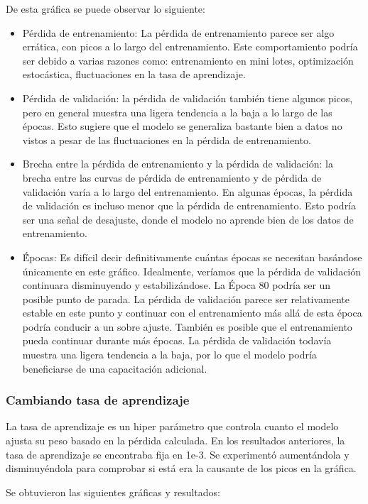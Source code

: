 \documentclass{article}
\begin{document}
De esta gráfica se puede observar lo siguiente:
\begin{itemize}
    \item Pérdida de entrenamiento: La pérdida de entrenamiento parece ser algo errática, con picos a lo largo del entrenamiento. Este comportamiento podría ser debido a varias razones como: entrenamiento en mini lotes, optimización estocástica, fluctuaciones en la tasa de aprendizaje.
    \item Pérdida de validación: la pérdida de validación también tiene algunos picos, pero en general muestra una ligera tendencia a la baja a lo largo de las épocas. Esto sugiere que el modelo se generaliza bastante bien a datos no vistos a pesar de las fluctuaciones en la pérdida de entrenamiento.
    \item Brecha entre la pérdida de entrenamiento y la pérdida de validación: la brecha entre las curvas de pérdida de entrenamiento y de pérdida de validación varía a lo largo del entrenamiento. En algunas épocas, la pérdida de validación es incluso menor que la pérdida de entrenamiento. Esto podría ser una señal de desajuste, donde el modelo no aprende bien de los datos de entrenamiento.
    \item \'Épocas: Es difícil decir definitivamente cuántas épocas se necesitan basándose únicamente en este gráfico. Idealmente, veríamos que la pérdida de validación continuara disminuyendo y estabilizándose. La Época 80 podría ser un posible punto de parada. La pérdida de validación parece ser relativamente estable en este punto y continuar con el entrenamiento más allá de esta época podría conducir a un sobre ajuste.
    También es posible que el entrenamiento pueda continuar durante más épocas. La pérdida de validación todavía muestra una ligera tendencia a la baja, por lo que el modelo podría beneficiarse de una capacitación adicional.
\end{itemize}

\subsubsection{Cambiando tasa de aprendizaje}
La tasa de aprendizaje es un hiper parámetro que controla cuanto el modelo ajusta su peso basado en la pérdida calculada.
En los resultados anteriores, la tasa de aprendizaje se encontraba fija en 1e-3.
Se experimentó aumentándola y disminuyéndola para comprobar si está era la causante de los picos en la gráfica.

Se obtuvieron las siguientes gráficas y resultados:
\end{document}
